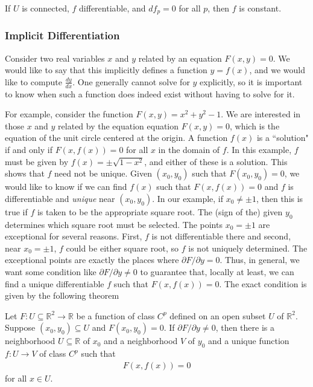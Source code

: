 \documentclass[12pt,letterpaper,reqno]{article}
\numberwithin{equation}{section}
\newcommand{\R}{\ensuremath{\mathbb R}}
\newcommand{\fixme}[1]{{\color{orange}{[#1]}}}
\begin{document}
{\begin{thm}
If $U$ is connected, $f$ differentiable, and $df_p=0$ for all $p$, then $f$ is constant.	
\end{thm}

\fixme{Does this fit in somewhere? If so, discuss and prove this.}

\subsubsection{Implicit Differentiation}
Consider two real variables $x$ and $y$ related by an equation $F(x,y)=0$. We would like to say that this implicitly defines a function $y=f(x)$, and we would like to compute $\frac{dy}{dx}$. One generally cannot solve for $y$ explicitly, so it is important to know when such a function does indeed exist without having to solve for it.


For example, consider the function $F(x,y)=x^2+y^2-1$. We are interested in those $x$ and $y$ related by the equation equation $F(x,y)=0$, which is the equation of the unit circle centered at the origin. A function $f(x)$ is a ``solution" if and only if $F(x,f(x))=0$ for all $x$ in the domain of $f$. In this example, $f$ must be given by $f(x)=\pm \sqrt{1-x^2}$, and either of these is a solution. This shows that $f$ need not be unique. Given $(x_0,y_0)$ such that $F(x_0,y_0)=0$, we would like to know if we can find $f(x)$ such that $F(x,f(x))=0$ and $f$ is differentiable and \emph{unique} near $(x_0,y_0)$. In our example, if $x_0 \neq \pm 1$, then this is true if $f$ is taken to be the appropriate square root. The (sign of the) given $y_0$ determines which square root must be selected. The points $x_0=\pm 1$ are exceptional for several reasons. First, $f$ is not differentiable there and second, near $x_0=\pm 1$, $f$ could be either square root, so $f$ is not uniquely determined. The exceptional points are exactly the places where $\partial F/\partial y=0$. Thus, in general, we want some condition like $\partial F/\partial y \neq 0$ to guarantee that, locally at least, we can find a unique differentiable $f$ such that $F(x,f(x))=0$. The exact condition is given by the following theorem

\begin{thm}
	Let $F:U \subseteq \R^2 \to \R$ be a function of class $C^p$ defined on an open subset $U$ of $\R^2$. Suppose $(x_0,y_0) \subseteq U$ and $F(x_0,y_0)=0$. If $\partial F/\partial y \neq 0$, then there is a neighborhood $U \subseteq \R$ of $x_0$ and a neighborhood $V$ of $y_0$ and a unique function $f:U \to V$ of class $C^p$ such that 
	\begin{align*}
		F(x,f(x))=0
	\end{align*}
	for all $x \in U$. 
\end{thm}

}
\end{document}

